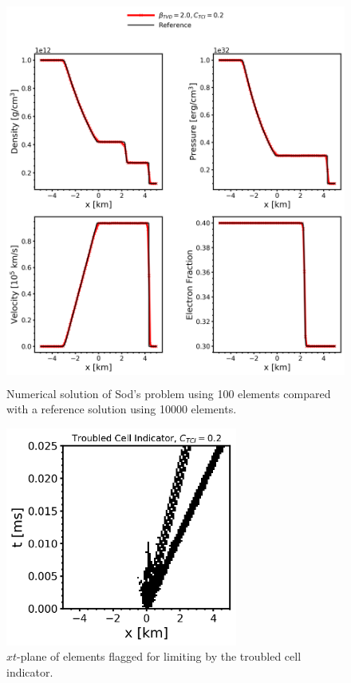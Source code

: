 \documentclass[onecolumn]{aastex62}
\begin{document}
\begin{figure}[h!]
  \centering
  \includegraphics[width=32pc,height=30pc]{optimal.png}
  \centering
  \caption{\label{fig:SodSedovOptimal} Numerical solution of Sod's problem using
    100 elements compared with a reference solution using 10000 elements.}
\end{figure}
\begin{figure}
  \includegraphics[width=18pc]{optimal_shock.png}
  \caption{$xt$-plane of elements flagged for limiting by the troubled cell indicator.}
  \label{fig:shock}
\end{figure}
\end{document}
